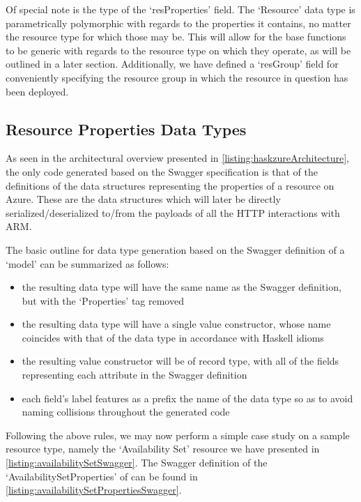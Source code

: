 \documentclass[11pt]{report}
\begin{document}
Of special note is the type of the `resProperties' field. The `Resource'
data type is parametrically polymorphic with regards to the properties it
contains, no matter the resource type for which those may be. This will allow
for the base functions to be generic with regards to the resource type on which they
operate, as will be outlined in a later section. Additionally, we have
defined a `resGroup' field for conveniently specifying the resource group in which
the resource in question has been deployed.

\subsection{Resource Properties Data Types}

As seen in the architectural overview presented in
\autoref{listing:haskzureArchitecture}, the only code generated based on the
Swagger specification is that of the definitions of the data structures
representing the properties of a resource on Azure. These are the data structures
which will later be directly serialized/deserialized to/from the payloads of
all the HTTP interactions with ARM. \newline

The basic outline for data type generation based on the Swagger definition of a
`model' can be summarized as follows:

\begin{itemize}
    \item{} the resulting data type will have the same name as the Swagger
        definition, but with the `Properties' tag removed
    \item{} the resulting data type will have a single value constructor, whose
        name coincides with that of the data type in accordance with Haskell
        idioms
    \item{} the resulting value constructor will be of record type, with all of
        the fields representing each attribute in the Swagger definition
    \item{} each field's label features as a prefix the name of the data type so
        as to avoid naming collisions throughout the generated code
\end{itemize}

Following the above rules, we may now perform a simple case study on a sample
resource type, namely the `Availability Set' resource we have presented in
\autoref{listing:availabilitySetSwagger}. The Swagger definition of the
`AvailabilitySetProperties' of can be found in
\autoref{listing:availabilitySetPropertiesSwagger}.
\end{document}

